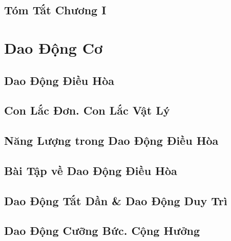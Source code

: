 \documentclass{article}
\numberwithin{equation}{section}
\begin{document}

\subsection{Tóm Tắt Chương I}


\section{Dao Động Cơ}

\subsection{Dao Động Điều Hòa}


\subsection{Con Lắc Đơn. Con Lắc Vật Lý}


\subsection{Năng Lượng trong Dao Động Điều Hòa}


\subsection{Bài Tập về Dao Động Điều Hòa}


\subsection{Dao Động Tắt Dần \& Dao Động Duy Trì}


\subsection{Dao Động Cưỡng Bức. Cộng Hưởng}
\end{document}
